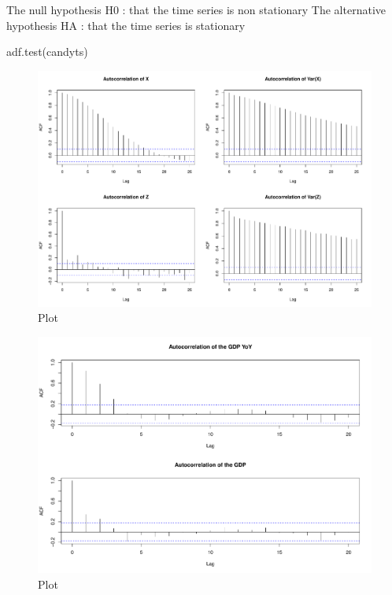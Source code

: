 \documentclass[12pt,a4paper,oneside]{book}
\begin{document}
The null hypothesis H0 : that the time series is non stationary The alternative hypothesis HA : that the time series is stationary

adf.test(candyts)

\begin{figure}[H]
    \centering
    \captionsetup{justification=centering}
    \includegraphics[scale=0.5]{Graphs/ACF.pdf}
    \caption{Plot }
    \label{fig:ACF}
\end{figure}

\begin{figure}[H]
    \centering
    \captionsetup{justification=centering}
    \includegraphics[scale=0.45]{Graphs/ACF_GDP.pdf}
    \caption{Plot }
    \label{fig:ACF_GDP}
\end{figure}
\end{document}
